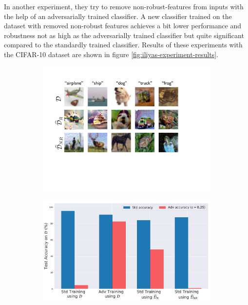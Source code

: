 \documentclass[oneside]{book}
\begin{document}
In another experiment, they try to remove non-robust-features from inputs with the help of an adversarially trained classifier. A new classifier trained on the dataset with removed non-robust features achieves a bit lower performance and robustness not as high as the adversarially trained classifier but quite significant compared to the standardly trained classifier. Results of these experiments with the CIFAR-10 dataset \citep{Krizhevsky:2009:LMLFTI} are shown in figure \ref{fig:iliyas-experiment-results}.

\begin{figure}[htbp!]
	\centering
	\begin{subfigure}[b]{0.45\textwidth}
		\centering
		\includegraphics[width=1.0\textwidth]{figures/adversarial-examples/ilyas/cifar_datasets.pdf}
		\vfill\null
		\caption{}
		\label{fig:robust_inputs}
	\end{subfigure}
	\hfill
	\begin{subfigure}[b]{0.5\textwidth}
		\centering
		\includegraphics[width=\textwidth]{figures/adversarial-examples/ilyas/CIFAR_res.pdf}

\end{subfigure}
\end{figure}
\end{document}
